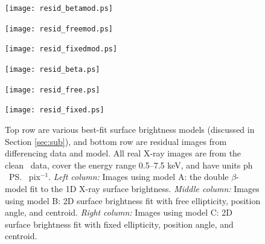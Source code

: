 \begin{figure}
  \begin{center}
    \begin{minipage}{0.33\linewidth}
      \texttt{[image: resid\_betamod.ps]}
    \end{minipage}
    \begin{minipage}{0.33\linewidth}
      \texttt{[image: resid\_freemod.ps]}
    \end{minipage}
    \begin{minipage}{0.33\linewidth}
      \texttt{[image: resid\_fixedmod.ps]}
    \end{minipage}
    \begin{minipage}{0.33\linewidth}
      \texttt{[image: resid\_beta.ps]}
    \end{minipage}
    \begin{minipage}{0.33\linewidth}
      \texttt{[image: resid\_free.ps]}
    \end{minipage}
    \begin{minipage}{0.33\linewidth}
      \texttt{[image: resid\_fixed.ps]}
    \end{minipage}
    \caption{Top row are various best-fit surface brightness models
      (discussed in Section \ref{sec:sub}), and bottom row are
      residual images from differencing data and model. All real X-ray
      images are from the clean \cxo\ data, cover the energy range
      0.5--7.5 keV, and have units ph \pcmsq\ \ps\ pix$^{-1}$. {\it
        Left column:} Images using model A: the double $\beta$-model
      fit to the 1D X-ray surface brightness. {\it Middle column:}
      Images using model B: 2D surface brightness fit with free
      ellipticity, position angle, and centroid. {\it Right column:}
      Images using model C: 2D surface brightness fit with fixed
      ellipticity, position angle, and centroid.}
    \label{fig:multiresid}
  \end{center}
\end{figure}

